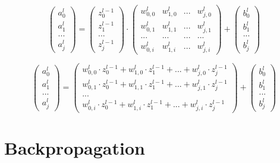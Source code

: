 \documentclass{article}
\begin{document}
\[ 
\left(\begin{array}{c} a_0^l \\ a_1^l \\ ... \\ a_j^l \end{array}\right)
=
\left(\begin{array}{c} z_0^{l-1} \\ z_1^{l-1} \\ ... \\ z_j^{l-1} \end{array}\right)
\cdot
\begin{pmatrix}
    w_{0,0}^l & w_{1,0}^l & ... & w_{j,0}^l \\
    w_{0,1}^l & w_{1,1}^l & ... & w_{j,1}^l \\
    ... & ... & ... & ... \\
    w_{0,i}^l & w_{1,i}^l & ... & w_{j,i}^l
\end{pmatrix}
+
\left(\begin{array}{c} b_0^l \\ b_1^l \\ ... \\ b_j^l \end{array}\right)
 \]

 \[
\left(\begin{array}{c} a_0^l \\ a_1^l \\ ... \\ a_j^l \end{array}\right)
=
\left(\begin{array}{c}
    w_{0,0}^l \cdot z_0^{l-1} + w_{1,0}^l \cdot z_1^{l-1} + ... + w_{j,0}^l \cdot z_j^{l-1} \\
    w_{0,1}^l \cdot z_0^{l-1} + w_{1,1}^l \cdot z_1^{l-1} + ... + w_{j,1}^l \cdot z_j^{l-1} \\
    ... \\
    w_{0,i}^l \cdot z_0^{l-1} + w_{1,i}^l \cdot z_1^{l-1} + ... + w_{j,i}^l \cdot z_j^{l-1}
\end{array}\right)
+
\left(\begin{array}{c} b_0^l \\ b_1^l \\ ... \\ b_j^l \end{array}\right)\]


\newpage
\section{Backpropagation}
\end{document}
